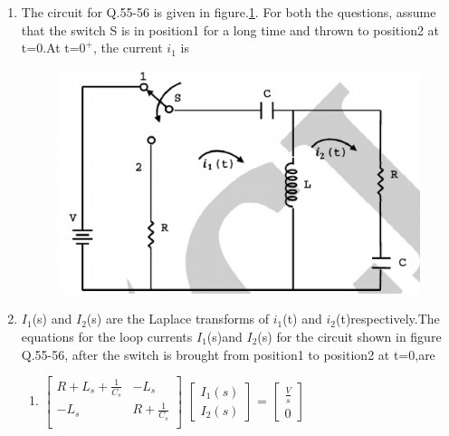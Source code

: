 \documentclass[journal,12pt,twocolumn]{IEEEtran}
\begin{document}
\begin{enumerate}
\item The circuit for Q.55-56 is given in figure.\ref{fig50}. For both the questions, assume that the switch S is in position1 for a long time and thrown to position2 at t=0.At t=$0^{+}$, the current $i_{1}$ is
\begin{enumerate}
\begin{figure}[!h]
\begin{center}
\includegraphics[scale=0.5]{./figs/fig50.eps}
\caption{}
\label{fig50}
\end{center}
\end{figure}
\end{enumerate}

\item $I_{1}$(s) and $I_{2}$(s) are the Laplace transforms of $i_{1}$(t) and $i_{2}$(t)respectively.The equations for the loop currents $I_{1}$(s)and $I_{2}$(s) for the circuit shown in figure Q.55-56, after the switch is brought from position1 to position2 at t=0,are
\begin{enumerate}
\setlength\itemsep{2em}
\item $\begin{bmatrix}
R+L_{s}+\frac{1}{C_{s}} & -L_{s}\\
-L_{s} & R+\frac{1}{C_{s}}\\
\end{bmatrix}$
\quad
$\begin{bmatrix}
I_{1}(s)\\
I_{2}(s)
\end{bmatrix}$
\quad =
$\begin{bmatrix}
\frac{V}{s}\\
0
\end{bmatrix}$


\end{enumerate}
\end{enumerate}
\end{document}
